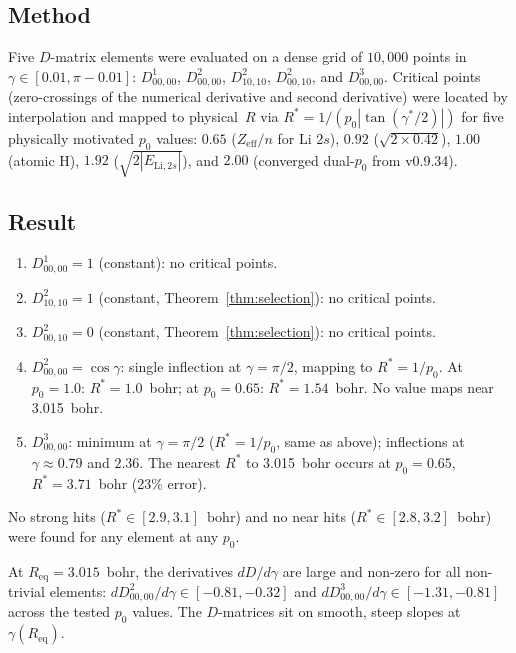 \documentclass[aps,pra,twocolumn,superscriptaddress,longbibliography]{revtex4-2}
\begin{document}
\subsection{Method}

Five $D$-matrix elements were evaluated on a dense grid of $10{,}000$
points in $\gamma \in [0.01, \pi - 0.01]$:
$D^1_{00,00}$, $D^2_{00,00}$, $D^2_{10,10}$, $D^2_{00,10}$, and
$D^3_{00,00}$.
Critical points (zero-crossings of the numerical derivative and second
derivative) were located by interpolation and mapped to physical~$R$ via
$R^* = 1/(p_0 |\tan(\gamma^*/2)|)$ for five physically motivated $p_0$
values: $0.65$ ($Z_{\text{eff}}/n$ for Li $2s$), $0.92$
($\sqrt{2 \times 0.42}$), $1.00$ (atomic H), $1.92$
($\sqrt{2|E_{\text{Li},2s}|}$), and $2.00$ (converged dual-$p_0$ from
v0.9.34).

\subsection{Result}

\begin{enumerate}

\item $D^1_{00,00} = 1$ (constant): no critical points.

\item $D^2_{10,10} = 1$ (constant, Theorem~\ref{thm:selection}):
  no critical points.

\item $D^2_{00,10} = 0$ (constant, Theorem~\ref{thm:selection}):
  no critical points.

\item $D^2_{00,00} = \cos\gamma$: single inflection at
  $\gamma = \pi/2$, mapping to $R^* = 1/p_0$.  At $p_0 = 1.0$:
  $R^* = 1.0$~bohr; at $p_0 = 0.65$: $R^* = 1.54$~bohr.  No value
  maps near 3.015~bohr.

\item $D^3_{00,00}$: minimum at $\gamma = \pi/2$ ($R^* = 1/p_0$,
  same as above); inflections at $\gamma \approx 0.79$ and $2.36$.
  The nearest $R^*$ to 3.015~bohr occurs at $p_0 = 0.65$,
  $R^* = 3.71$~bohr (23\% error).

\end{enumerate}

No strong hits ($R^* \in [2.9, 3.1]$~bohr) and no near hits
($R^* \in [2.8, 3.2]$~bohr) were found for any element at any $p_0$.

At $R_{\text{eq}} = 3.015$~bohr, the derivatives $dD/d\gamma$ are large
and non-zero for all non-trivial elements: $dD^2_{00,00}/d\gamma \in
[-0.81, -0.32]$ and $dD^3_{00,00}/d\gamma \in [-1.31, -0.81]$
across the tested $p_0$ values.  The $D$-matrices sit on smooth,
steep slopes at $\gamma(R_{\text{eq}})$.
\end{document}
